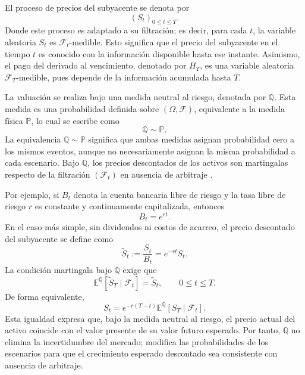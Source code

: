 \documentclass[11pt,letterpaper]{article}
\newcommand{\E}{\mathbb{E}}
\newcommand{\Prob}{\mathbb{P}}
\newcommand{\Q}{\mathbb{Q}}
\begin{document}
El proceso de precios del subyacente se denota por
\begin{equation}
(S_t)_{0\leq t\leq T}.
\end{equation}
Donde este proceso es adaptado a su filtración; es decir, para cada \(t\), la variable aleatoria \(S_t\) es \(\mathcal{F}_t\)-medible. Esto significa que el precio del subyacente en el tiempo \(t\) es conocido con la información disponible hasta ese instante. Asimismo, el pago del derivado al vencimiento, denotado por \(H_T\), es una variable aleatoria \(\mathcal{F}_T\)-medible, pues depende de la información acumulada hasta \(T\).

La valuación se realiza bajo una medida neutral al riesgo, denotada por \(\Q\). Esta medida es una probabilidad definida sobre \((\Omega,\mathcal{F})\), equivalente a la medida física \(\Prob\), lo cual se escribe como
\begin{equation}
\Q\sim\Prob.
\end{equation}
La equivalencia \(\Q\sim\Prob\) significa que ambas medidas asignan probabilidad cero a los mismos eventos, aunque no necesariamente asignan la misma probabilidad a cada escenario. Bajo \(\Q\), los precios descontados de los activos son martingalas respecto de la filtración \((\mathcal{F}_t)\) en ausencia de arbitraje \citep{shreve2004}.

Por ejemplo, si \(B_t\) denota la cuenta bancaria libre de riesgo y la tasa libre de riesgo \(r\) es constante y continuamente capitalizada, entonces
\begin{equation}
B_t=e^{rt}.
\end{equation}
En el caso más simple, sin dividendos ni costos de acarreo, el precio descontado del subyacente se define como
\begin{equation}
\widetilde S_t
:=
\frac{S_t}{B_t}
=
e^{-rt}S_t.
\end{equation}
La condición martingala bajo \(\Q\) exige que
\begin{equation}
\E^\Q\!\left[\widetilde S_T\mid\mathcal{F}_t\right]
=
\widetilde S_t,
\qquad
0\leq t\leq T.
\end{equation}
De forma equivalente,
\begin{equation}
S_t
=
e^{-r(T-t)}
\E^\Q\!\left[S_T\mid\mathcal{F}_t\right].
\end{equation}
Esta igualdad expresa que, bajo la medida neutral al riesgo, el precio actual del activo coincide con el valor presente de su valor futuro esperado. Por tanto, \(\Q\) no elimina la incertidumbre del mercado; modifica las probabilidades de los escenarios para que el crecimiento esperado descontado sea consistente con ausencia de arbitraje.
\end{document}
